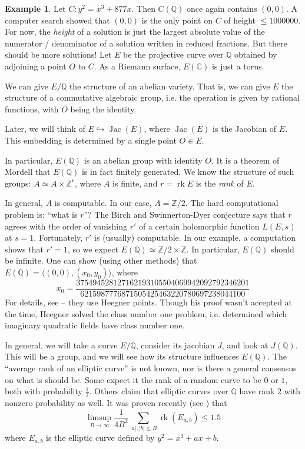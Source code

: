 \documentclass{article}
\theoremstyle{definition}
\newtheorem{example}[subsection]{Example}
\begin{document}
\begin{example}
Let $C:y^2=x^3+877 x$. Then $C(\mathbb{Q})$ once again contains $(0,0)$. A 
computer search showed that $(0,0)$ is the only point on $C$ of height 
$\leqslant 1000000$. For now, the \emph{height} of a solution is just the 
largest absolute value of the numerator / denominator of a solution written 
in reduced fractions. But there should be more solutions! Let $E$ be the 
projective curve over $\mathbb{Q}$ obtained by adjoining a point $O$ to $C$. 
As a Riemann surface, $E(\mathbb{C})$ is just a torus. 

We can give $E/\mathbb{Q}$ the structure of an abelian variety. That is, 
we can give $E$ the structure of a commutative algebraic group, i.e. the 
operation is given by rational functions, with $O$ being the identity. 

Later, we will think of $E\hookrightarrow \operatorname{Jac}(E)$, where 
$\operatorname{Jac}(E)$ is the Jacobian of $E$. This embedding is determined 
by a single point $O\in E$. 

In particular, $E(\mathbb{Q})$ is an abelian group with identity $O$. It is 
a theorem of Mordell that $E(\mathbb{Q})$ is in fact finitely generated. We 
know the structure of such groups: $A\simeq A\times \mathbb{Z}^r$, where 
$A$ is finite, and $r=\operatorname{rk} E$ is the \emph{rank} of $E$. 

In general, $A$ is computable. In our case, $A=\mathbb{Z}/2$. The hard 
computational problem is: ``what is $r$''? The Birch and Swinnerton-Dyer 
conjecture says that $r$ agrees with the order of vanishing $r'$ of a certain 
holomorphic function $L(E,s)$ at $s=1$. Fortunately, $r'$ is (usually) 
computable. In our example, a computation shows that $r'=1$, so we expect 
$E(\mathbb{Q})\simeq \mathbb{Z}/2\times\mathbb{Z}$. In particular, 
$E(\mathbb{Q})$ should be infinite. One can show (using other methods) that 
$E(\mathbb{Q})=\langle (0,0),(x_0,y_0)\rangle$, where 
\[
  x_0 = \frac{37 5494 5281 2716 2193 1055 0406 9942 0927 9234 6201}{6215 9877 7687 1505 4254 6322 0780 6972 3804 4100}
\]
For details, see \cite{br84} -- they use Heegner points. Though his proof wasn't 
accepted at the time, Heegner solved the class number one problem, i.e. 
determined which imaginary quadratic fields have class number one. 
\end{example}

In general, we will take a curve $E/\mathbb{Q}$, consider its jacobian $J$, 
and look at $J(\mathbb{Q})$. This will be a group, and we will see how its 
structure influences $E(\mathbb{Q})$. The ``average rank of an elliptic 
curve'' is not known, nor is there a general consensus on what is should be. 
Some expect it the rank of a random curve to be $0$ or $1$, both with 
probability $\frac 1 2$. Others claim that elliptic curves over $\mathbb{Q}$ 
have rank $2$ with nonzero probability as well. It was proven recently (see 
\cite[\S 1]{bh10}) that 
\[
  \limsup_{B\to\infty} \frac{1}{4 B^2} \sum_{|a|,|b|\leqslant B} \operatorname{rk}(E_{a,b}) \leqslant 1.5
\]
where $E_{a,b}$ is the elliptic curve defined by $y^2=x^3 +a x+b$.
\end{document}
